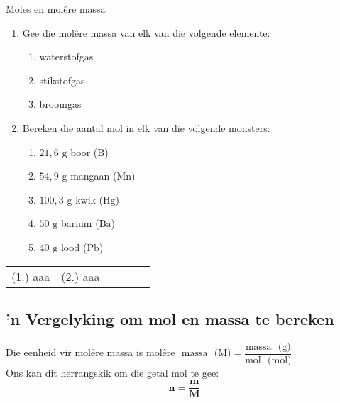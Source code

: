 \begin{exercises}{Moles en mol\^{e}re massa}
\label{m38717*id277281}\begin{enumerate}[noitemsep, label=\textbf{\arabic*}. ] 
\label{m38717*uid14}\item Gee die mol\^{e}re massa van elk van die volgende elemente:
\label{m38717*id277295}\begin{enumerate}[noitemsep, label=\textbf{\alph*}. ] 
\label{m38717*uid15}\item waterstofgas
\label{m38717*uid16}\item stikstofgas
\label{m38717*uid17}\item broomgas
\end{enumerate}
                \label{m38717*uid18}\item Bereken die aantal mol in elk van die volgende monsters:
\label{m38717*id277346}\begin{enumerate}[noitemsep, label=\textbf{\alph*}. ] 
            \label{m38717*uid19}\item $21,6 \text{ g}$ boor ($\text{B}$)
\label{m38717*uid20}\item $54,9 \text{ g}$ mangaan ($\text{Mn}$)
\label{m38717*uid21}\item $100,3 \text{ g}$ kwik ($\text{Hg}$)
\label{m38717*uid22}\item $50 \text{ g}$ barium ($\text{Ba}$)
\label{m38717*uid23}\item $40 \text{ g}$ lood ($\text{Pb}$)
\end{enumerate}
                \end{enumerate}
\practiceinfo
\par 
 \par \begin{tabular}[h]{cccccc}
 (1.) aaa  &  (2.) aaa  & \end{tabular}
\end{exercises}
            \subsection*{'n Vergelyking om mol en massa te bereken}
            \nopagebreak
      \label{m38717*id277432}Die eenheid vir mol\^{e}re massa is
$\text{mol\^{e}re ~massa ~(M)} = \dfrac{\text{massa ~(g)}}{\text{mol ~(mol)}}$ \\
Ons kan dit herrangskik om die getal mol te gee:
      \label{m38717*id277436}\nopagebreak\noindent{}
    \begin{equation*}
    \mathbf{n} = \dfrac{\mathbf{m}}{\mathbf{M}}
      \end{equation*}

